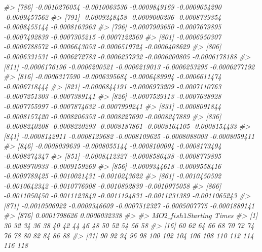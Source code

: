 \documentclass[
]{article}
\newenvironment{Shaded}{\begin{snugshade}}{\end{snugshade}}
\newcommand{\CommentTok}[1]{\textcolor[rgb]{0.56,0.35,0.01}{\textit{#1}}}
\begin{document}
\begin{Shaded}
\begin{Highlighting}[]
\CommentTok{\#\textgreater{} [786] {-}0.0010276054 {-}0.0010063536 {-}0.0009849169 {-}0.0009654290 {-}0.0009457562}
\CommentTok{\#\textgreater{} [791] {-}0.0009248458 {-}0.0009000236 {-}0.0008739354 {-}0.0008455144 {-}0.0008163963}
\CommentTok{\#\textgreater{} [796] {-}0.0007903650 {-}0.0007679895 {-}0.0007492839 {-}0.0007305215 {-}0.0007122569}
\CommentTok{\#\textgreater{} [801] {-}0.0006950307 {-}0.0006788572 {-}0.0006643053 {-}0.0006519724 {-}0.0006408629}
\CommentTok{\#\textgreater{} [806] {-}0.0006331531 {-}0.0006272783 {-}0.0006237932 {-}0.0006200805 {-}0.0006178188}
\CommentTok{\#\textgreater{} [811] {-}0.0006176196 {-}0.0006200521 {-}0.0006219013 {-}0.0006253295 {-}0.0006277192}
\CommentTok{\#\textgreater{} [816] {-}0.0006317590 {-}0.0006395684 {-}0.0006489994 {-}0.0006611474 {-}0.0006718444}
\CommentTok{\#\textgreater{} [821] {-}0.0006844191 {-}0.0006973209 {-}0.0007110763 {-}0.0007251303 {-}0.0007389141}
\CommentTok{\#\textgreater{} [826] {-}0.0007529113 {-}0.0007638928 {-}0.0007755997 {-}0.0007874632 {-}0.0007999241}
\CommentTok{\#\textgreater{} [831] {-}0.0008091844 {-}0.0008157420 {-}0.0008206353 {-}0.0008227690 {-}0.0008247889}
\CommentTok{\#\textgreater{} [836] {-}0.0008240208 {-}0.0008220293 {-}0.0008187861 {-}0.0008164105 {-}0.0008154433}
\CommentTok{\#\textgreater{} [841] {-}0.0008142911 {-}0.0008129682 {-}0.0008109625 {-}0.0008088003 {-}0.0008059411}
\CommentTok{\#\textgreater{} [846] {-}0.0008039639 {-}0.0008055144 {-}0.0008100094 {-}0.0008173494 {-}0.0008274347}
\CommentTok{\#\textgreater{} [851] {-}0.0008412327 {-}0.0008586438 {-}0.0008779895 {-}0.0008970933 {-}0.0009159269}
\CommentTok{\#\textgreater{} [856] {-}0.0009344618 {-}0.0009558416 {-}0.0009789425 {-}0.0010021431 {-}0.0010243622}
\CommentTok{\#\textgreater{} [861] {-}0.0010450592 {-}0.0010642342 {-}0.0010776908 {-}0.0010892839 {-}0.0010975058}
\CommentTok{\#\textgreater{} [866] {-}0.0011050450 {-}0.0011123849 {-}0.0011194831 {-}0.0011231389 {-}0.0011065243}
\CommentTok{\#\textgreater{} [871] {-}0.0010506922 {-}0.0009346609 {-}0.0007512327 {-}0.0005007775 {-}0.0001889141}
\CommentTok{\#\textgreater{} [876]  0.0001798626  0.0006032338}
\CommentTok{\#\textgreater{} }
\CommentTok{\#\textgreater{} $MO2\_fish1$\textasciigrave{}Starting Times\textasciigrave{}}
\CommentTok{\#\textgreater{}   [1]   30   32   34   36   38   40   42   44   46   48   50   52   54   56   58}
\CommentTok{\#\textgreater{}  [16]   60   62   64   66   68   70   72   74   76   78   80   82   84   86   88}
\CommentTok{\#\textgreater{}  [31]   90   92   94   96   98  100  102  104  106  108  110  112  114  116  118}

\end{Highlighting}
\end{Shaded}
\end{document}
